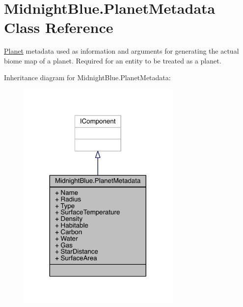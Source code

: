 \hypertarget{class_midnight_blue_1_1_planet_metadata}{}\section{Midnight\+Blue.\+Planet\+Metadata Class Reference}
\label{class_midnight_blue_1_1_planet_metadata}


\hyperlink{class_midnight_blue_1_1_planet}{Planet} metadata used as information and arguments for generating the actual biome map of a planet. Required for an entity to be treated as a planet.  




Inheritance diagram for Midnight\+Blue.\+Planet\+Metadata\+:
\nopagebreak
\begin{figure}[H]
\begin{center}
\leavevmode
\includegraphics[width=227pt]{class_midnight_blue_1_1_planet_metadata__inherit__graph}
\end{center}
\end{figure}


